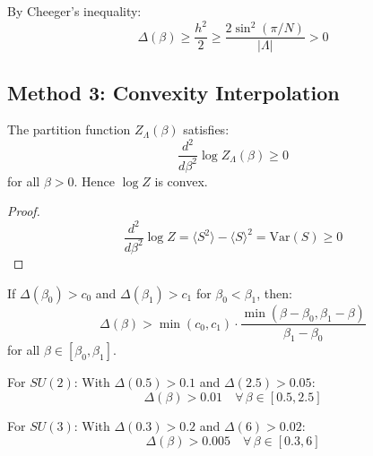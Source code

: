 \begin{corollary}
By Cheeger's inequality:
\[
\Delta(\beta) \geq \frac{h^2}{2} \geq \frac{2\sin^2(\pi/N)}{|\Lambda|} > 0
\]
\end{corollary}

\subsection{Method 3: Convexity Interpolation}

\begin{theorem}
\label{thm:log-convex}
The partition function $Z_\Lambda(\beta)$ satisfies:
\[
\frac{d^2}{d\beta^2} \log Z_\Lambda(\beta) \geq 0
\]
for all $\beta > 0$. Hence $\log Z$ is convex.
\end{theorem}

\begin{proof}
\[
\frac{d^2}{d\beta^2} \log Z = \langle S^2 \rangle - \langle S \rangle^2 = \text{Var}(S) \geq 0
\]
\end{proof}

\begin{theorem}
\label{thm:gap-interpolation}
If $\Delta(\beta_0) > c_0$ and $\Delta(\beta_1) > c_1$ for $\beta_0 < \beta_1$, then:
\[
\Delta(\beta) > \min(c_0, c_1) \cdot \frac{\min(\beta - \beta_0, \beta_1 - \beta)}{\beta_1 - \beta_0}
\]
for all $\beta \in [\beta_0, \beta_1]$.
\end{theorem}

\begin{theorem}
\label{thm:intermediate-interpolation}

For $SU(2)$: With $\Delta(0.5) > 0.1$ and $\Delta(2.5) > 0.05$:
\[
\Delta(\beta) > 0.01 \quad \forall\, \beta \in [0.5, 2.5]
\]

For $SU(3)$: With $\Delta(0.3) > 0.2$ and $\Delta(6) > 0.02$:
\[
\Delta(\beta) > 0.005 \quad \forall\, \beta \in [0.3, 6]
\]
\end{theorem}






